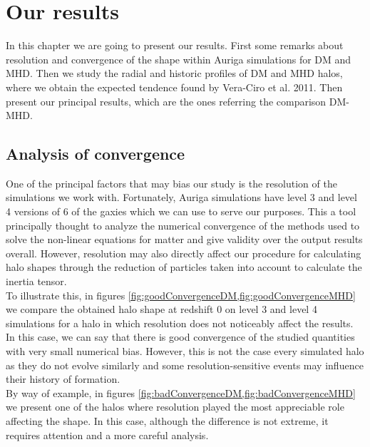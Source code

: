 \chapter{Our results}

In this chapter we are going to present our results. First some remarks about resolution and convergence of the shape within Auriga simulations for DM and MHD. Then we study the radial and historic profiles of DM and MHD halos, where we obtain the expected tendence found by Vera-Ciro et al. 2011. Then present our principal results, which are the ones referring the comparison DM-MHD.

\section{Analysis of convergence}
One of the principal factors that may bias our study is the resolution of the simulations we work with. Fortunately, Auriga simulations have level 3 and level 4 versions of 6 of the gaxies which we can use to serve our purposes. This a tool principally thought to analyze the numerical convergence of the methods used to solve the non-linear equations for matter and give validity over the output results overall. However, resolution may also directly affect our procedure for calculating halo shapes through the reduction of particles taken into account to calculate the inertia tensor.\\

To illustrate this, in figures \ref{fig:goodConvergenceDM,fig:goodConvergenceMHD} we compare the obtained halo shape at redshift 0 on level 3 and level 4 simulations for a halo in which resolution does not noticeably affect the results. In this case, we can say that there is good convergence of the studied quantities with very small numerical bias. However, this is not the case every simulated halo as they do not evolve similarly and some resolution-sensitive events may influence their history of formation.\\

 By way of example, in figures \ref{fig:badConvergenceDM,fig:badConvergenceMHD} we present one of the halos where resolution played the most appreciable role affecting the shape. In this case, although the difference is not extreme, it requires attention and a more careful analysis.\\

